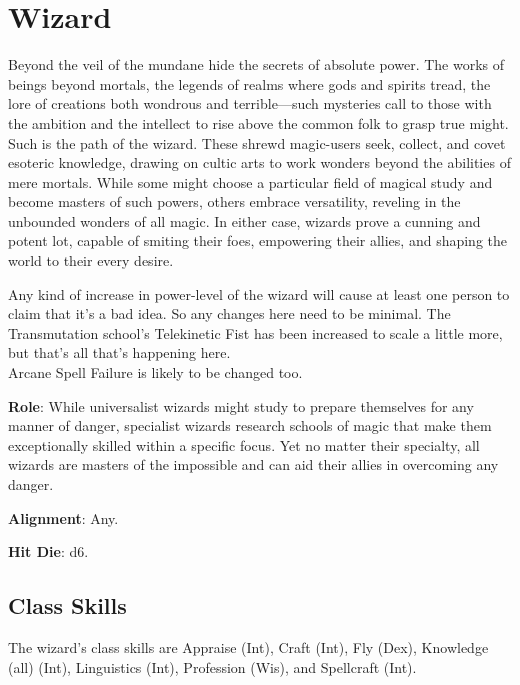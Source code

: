 \section{Wizard}

\label{f0}				
Beyond the veil of the mundane hide the secrets of absolute power. The works of beings beyond mortals, the legends of realms where gods and spirits tread, the lore of creations both wondrous and terrible---such mysteries call to those with the ambition and the intellect to rise above the common folk to grasp true might. Such is the path of the wizard. These shrewd magic-users seek, collect, and covet esoteric knowledge, drawing on cultic arts to work wonders beyond the abilities of mere mortals. While some might choose a particular field of magical study and become masters of such powers, others embrace versatility, reveling in the unbounded wonders of all magic. In either case, wizards prove a cunning and potent lot, capable of smiting their foes, empowering their allies, and shaping the world to their every desire.

\begin{formal}
 Any kind of increase in power-level of the wizard will cause at least one person to claim that it's a bad idea. So any changes
 here need to be minimal. The Transmutation school's Telekinetic Fist has been increased to scale a little more, but that's all
 that's happening here. \\
 Arcane Spell Failure is likely to be changed too. \\
\end{formal}


\textbf{Role}: While universalist wizards might study to prepare themselves for any manner of danger, specialist wizards research schools of magic that make them exceptionally skilled within a specific focus. Yet no matter their specialty, all wizards are masters of the impossible and can aid their allies in overcoming any danger.
				
\textbf{Alignment}: Any.
				
\textbf{Hit Die}: d6.
				
\subsection{Class Skills}

				
The wizard's class skills are Appraise (Int), Craft (Int), Fly (Dex), Knowledge (all) (Int), Linguistics (Int), Profession (Wis), and Spellcraft (Int). 
				
